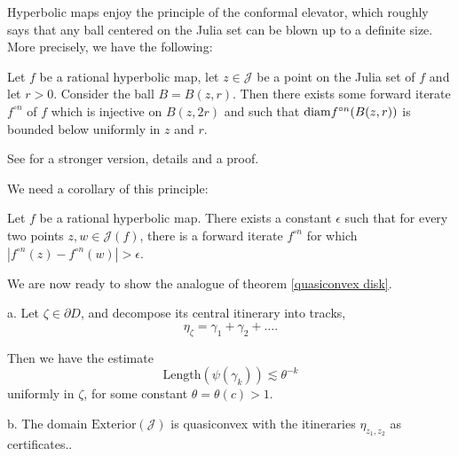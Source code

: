 Hyperbolic maps enjoy the principle of the conformal elevator, which roughly says that any ball centered on the Julia set can be blown up to a definite size. More precisely, we have the following:

\begin{proposition} \label{elevator}
	Let $f$ be a rational hyperbolic map, let $z\in \mathcal J$ be a point on the Julia set of $f$ and let $r>0$. Consider the ball $B=B(z,r)$. Then there exists some forward iterate $f^{\circ n}$ of $f$ which is injective on $B(z,2r)$ and such that
	$\mathrm{\mathrm{diam}} {f^{\circ n}(B(z,r))}$ is bounded below uniformly in $z$ and $r$. 
\end{proposition}

See \cite{BLM16} for a stronger version, details and a proof.

We need a corollary of this principle:

\begin{corollary} \label{elevator for points on julia}
	Let $f$ be a rational hyperbolic map. There exists a constant $\epsilon$ such that for every two points $z,w\in\mathcal{J}(f)$, there is a forward iterate
$f^{\circ n}$ for which $\left|f^{\circ n}(z)-f^{\circ n}(w)\right|>\epsilon$.	
\end{corollary}

\begin{comment}
\begin{proof}
	Apply proposition \ref{elevator} to a ball centered on the Julia set which contains $z,w$ on its boundary at roughly antipodal points. After blowing up we get points $f^{\circ n}(z),f^{\circ n}(w)$ which are a definite distance apart by Koebe's distortion theorem. /TODO: make this correct/
\end{proof}
\end{comment}

We are now ready to show the analogue of theorem \ref{quasiconvex disk}.
\begin{theorem} 
a. Let $\zeta\in\partial{D}$, and decompose its central itinerary into tracks, 
$$\eta_\zeta = \gamma _1 +\gamma_2 +\ldots.$$

Then we have the estimate
$$\mathrm{Length}(\psi(\gamma_{k}))\lesssim\theta^{-k}$$ uniformly in
$\zeta$, for some constant $\theta=\theta(c)>1$.

b. The domain $\mathrm{Exterior}(\mathcal{J})$ is quasiconvex  with the itineraries $\eta_{z_1,z_2}$ as certificates..
\end{theorem}

